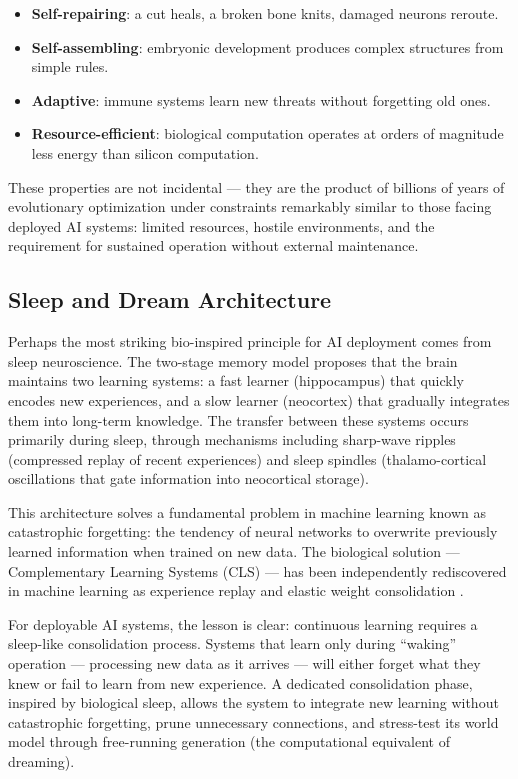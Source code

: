 \documentclass[11pt,a4paper]{article}
\begin{document}
\begin{itemize}[leftmargin=*, itemsep=2pt]
  \item \textbf{Self-repairing}: a cut heals, a broken bone knits, damaged neurons reroute.
  \item \textbf{Self-assembling}: embryonic development produces complex structures from simple rules.
  \item \textbf{Adaptive}: immune systems learn new threats without forgetting old ones.
  \item \textbf{Resource-efficient}: biological computation operates at orders of magnitude less energy than silicon computation.
\end{itemize}

These properties are not incidental --- they are the product of billions of years of evolutionary optimization under constraints remarkably similar to those facing deployed AI systems: limited resources, hostile environments, and the requirement for sustained operation without external maintenance.

\subsection{Sleep and Dream Architecture}

Perhaps the most striking bio-inspired principle for AI deployment comes from sleep neuroscience. The two-stage memory model \citep{marr1971, mcclelland1995} proposes that the brain maintains two learning systems: a fast learner (hippocampus) that quickly encodes new experiences, and a slow learner (neocortex) that gradually integrates them into long-term knowledge. The transfer between these systems occurs primarily during sleep, through mechanisms including sharp-wave ripples (compressed replay of recent experiences) and sleep spindles (thalamo-cortical oscillations that gate information into neocortical storage).

This architecture solves a fundamental problem in machine learning known as catastrophic forgetting: the tendency of neural networks to overwrite previously learned information when trained on new data. The biological solution --- Complementary Learning Systems (CLS) --- has been independently rediscovered in machine learning as experience replay \citep{lin1992, mnih2015} and elastic weight consolidation \citep{kirkpatrick2017}.

For deployable AI systems, the lesson is clear: continuous learning requires a sleep-like consolidation process. Systems that learn only during ``waking'' operation --- processing new data as it arrives --- will either forget what they knew or fail to learn from new experience. A dedicated consolidation phase, inspired by biological sleep, allows the system to integrate new learning without catastrophic forgetting, prune unnecessary connections, and stress-test its world model through free-running generation (the computational equivalent of dreaming).
\end{document}
